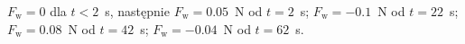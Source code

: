 $F_\mathrm{w}=0$ dla $t<2$~s, następnie $F_\mathrm{w}=0.05$~N od $t=2$~s; $F_\mathrm{w}=-0.1$~N od $t=22$~s; $F_\mathrm{w}=0.08$~N od $t=42$~s; $F_\mathrm{w}=-0.04$~N od $t=62$~s.
